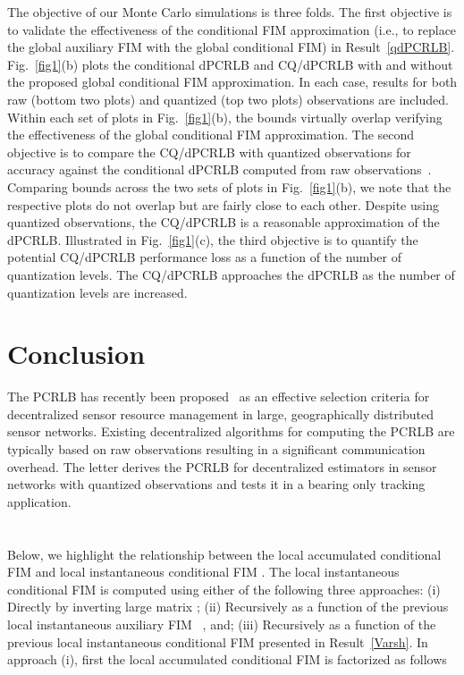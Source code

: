 \documentclass[10pt,twocolumn,twoside]{IEEEtran}
\begin{document}
The objective of our Monte Carlo simulations is three folds. The first
objective is to validate the effectiveness of the conditional FIM
approximation (i.e., to replace the global auxiliary FIM with the
global conditional FIM) in Result~\ref{qdPCRLB}. Fig.~\ref{fig1}(b)
plots the conditional dPCRLB and CQ/dPCRLB with and without the
proposed global conditional FIM approximation. In each case, results
for both raw (bottom two plots) and quantized (top two plots)
observations are included. Within each set of plots in
Fig.~\ref{fig1}(b), the bounds virtually overlap verifying the
effectiveness of the global conditional FIM approximation. The second
objective is to compare the CQ/dPCRLB with quantized observations for
accuracy against the conditional dPCRLB computed from raw
observations~\cite{Arash:SPL}. Comparing bounds across the two sets of
plots in Fig.~\ref{fig1}(b), we note that the respective plots do not
overlap but are fairly close to each other. Despite using quantized
observations, the CQ/dPCRLB is a reasonable approximation of the
dPCRLB. Illustrated in Fig.~\ref{fig1}(c), the third objective is to
quantify the potential CQ/dPCRLB performance loss as a function of the
number of quantization levels. The CQ/dPCRLB approaches the dPCRLB as
the number of quantization levels are increased.

\section{Conclusion} \label{sec:conclusion}
The PCRLB has recently been proposed~\cite{Tharmarasa:2011} as an
effective selection criteria for decentralized sensor resource
management in large, geographically distributed sensor networks.
Existing decentralized algorithms for computing the PCRLB are
typically based on raw observations resulting in a significant
communication overhead. The letter derives the PCRLB for decentralized
estimators in sensor networks with quantized observations and tests it
in a bearing only tracking application.
\appendices
\section{} \label{app:0}
\noindent
Below, we highlight the relationship between the local accumulated conditional FIM  and
local instantaneous conditional FIM .
The local instantaneous conditional FIM  is computed using either of the following three approaches: (i) Directly by inverting large matrix ;
 (ii)  Recursively as a function of the previous local instantaneous auxiliary FIM  ~\cite{Arash:SPL}, and; (iii) Recursively as a function of the previous local instantaneous conditional FIM  presented in Result~\ref{Varsh}.
In approach (i), first the local accumulated conditional FIM  is factorized as follows
\end{document}
